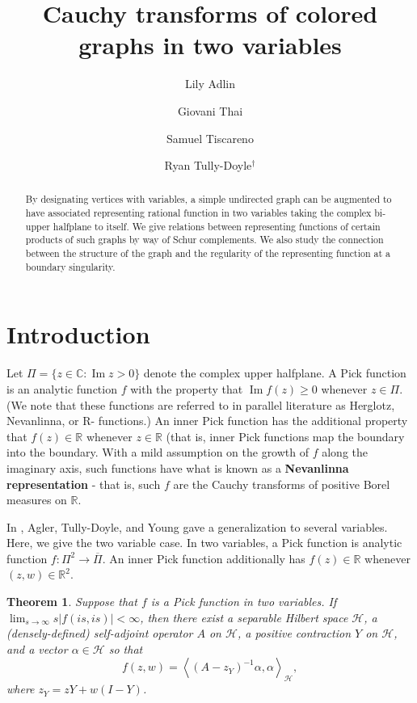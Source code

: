 \documentclass[12pt]{amsart}
\title{Cauchy transforms of colored graphs in two variables}
\author[L. Adlin]{Lily Adlin}
\author[G. Thai]{Giovani Thai}
\author[S. Tiscareno]{Samuel Tiscareno}
\author[R. Tully-Doyle]{
Ryan Tully-Doyle$^\dagger$
}
\newtheorem{theorem}{Theorem}[section]
\theoremstyle{remark}
\DeclareMathOperator{\IM}{Im}
\newcommand{\hilbert}{\mathcal{H}}
\newcommand{\C}{\mathbb{C}}
\newcommand{\R}{\mathbb{R}}
\newcommand{\cc}[1]{\overline{#1}}
\newcommand{\abs}[1]{\left\vert#1\right\vert}
\newcommand{\ip}[2]{\left\langle #1, #2 \right\rangle}
\newcommand{\inv}{^{-1}}
\numberwithin{equation}{section}
\newcommand{\dfn}[1]{{\bf #1}\index{#1}}
\begin{document}
\begin{abstract}
By designating vertices with variables, a simple undirected graph can be augmented to have associated representing rational function in two variables taking the complex bi-upper halfplane to itself. We give relations between representing functions of certain products of such graphs by way of Schur complements. We also study the connection between the structure of the graph and the regularity of the representing function at a boundary singularity.
\end{abstract}

\maketitle



\section{Introduction}
Let $\Pi = \{z \in \C: \IM z > 0\}$ denote the complex upper halfplane. A Pick function is an analytic function $f$ with the property that $\IM f(z) \geq 0$ whenever $z \in \Pi$. (We note that these functions are referred to in parallel literature as Herglotz, Nevanlinna, or R- functions.) An inner Pick function has the additional property that $f(z) \in \R$ whenever $z \in \R$ (that is, inner Pick functions map the boundary into the boundary. With a mild assumption on the growth of $f$ along the imaginary axis, such functions have what is known as a \dfn{Nevanlinna representation} - that is, such $f$ are the Cauchy transforms of positive Borel measures on $\R$.

In \cite{aty12}, Agler, Tully-Doyle, and Young gave a generalization to several variables. Here, we give the two variable case. In two variables, a Pick function is analytic function $f: \Pi^2 \to \cc{\Pi}$. An inner Pick function additionally has $f(z) \in \R$ whenever $(z,w) \in \R^2$.

\begin{theorem}
Suppose that $f$ is a Pick function  in two variables. If $\displaystyle \lim_{s\to\infty} s \abs{f(is, is)} < \infty$, then there exist a separable Hilbert space $\hilbert$, a (densely-defined) self-adjoint operator $A$ on $\hilbert$, a positive contraction $Y$ on $\hilbert$, and a vector $\alpha \in \hilbert$ so that 
\[
f(z, w) = \ip{(A - z_Y)\inv\alpha}{\alpha}_\hilbert,
\]
where $z_Y = zY + w(I - Y)$.
\end{theorem}
\end{document}
